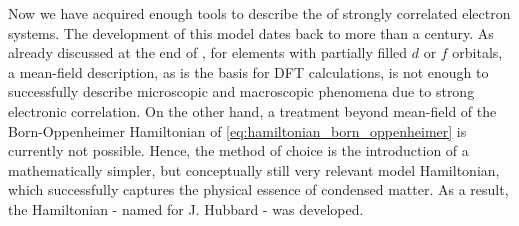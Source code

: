 \documentclass[../../main.tex]{subfiles}
\begin{document}
Now we have acquired enough tools to describe the  of strongly correlated electron systems. The development of this model dates back to more than a century. As already discussed at the end of , for elements with partially filled $d$ or $f$ orbitals, a mean-field description, as is the basis for DFT calculations, is not enough to successfully describe microscopic and macroscopic phenomena due to strong electronic correlation. On the other hand, a treatment beyond mean-field of the Born-Oppenheimer Hamiltonian of \eqref{eq:hamiltonian_born_oppenheimer} is currently not possible. Hence, the method of choice is the introduction of a mathematically simpler, but conceptually still very relevant model Hamiltonian, which successfully captures the physical essence of condensed matter. As a result, the Hamiltonian - named for J. Hubbard - was developed.
\end{document}
